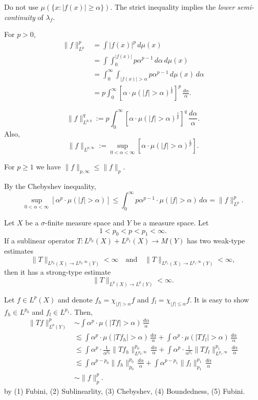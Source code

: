 \documentclass{../../large}
\begin{document}
Do not use $\mu(\{x:|f(x)|\ge\alpha\})$.
The strict inequality implies the \emph{lower semi-continuity} of $\lambda_f$.


For $p>0$,
\begin{align*}
\|f\|_{L^p}^p
&=\int|f(x)|^p\,d\mu(x)\\
&=\int\int_0^{|f(x)|}p\alpha^{p-1}\,d\alpha\,d\mu(x)\\
&=\int_0^\infty\int_{|f(x)|>\alpha}p\alpha^{p-1}\,d\mu(x)\,d\alpha\\
&=p\int_0^\infty\left[\alpha\cdot\mu(|f|>\alpha)^\frac1p\right]^p\,\frac{d\alpha}\alpha.
\end{align*}

\begin{defn}
\[\|f\|_{L^{p,q}}^q:=p\int_0^\infty\left[\alpha\cdot\mu(|f|>\alpha)^\frac1p\right]^q\,\frac{d\alpha}\alpha.\]
Also,
\[\|f\|_{L^{p,\infty}}:=\sup_{0<\alpha<\infty}\left[\alpha\cdot\mu(|f|>\alpha)^\frac1p\right].\]
\end{defn}
\begin{thm}
For $p\ge1$ we have $\|f\|_{p,\infty}\le\|f\|_p$.
\end{thm}
\begin{pf}
By the Chebyshev inequality,
\[\sup_{0<\alpha<\infty}\left[\alpha^p\cdot\mu(|f|>\alpha)\right]\le\int_0^\infty p\alpha^{p-1}\cdot\mu(|f|>\alpha)\,d\alpha=\|f\|_{L^p}^p.\]

\end{pf}

\begin{prb}
Let $X$ be a $\sigma$-finite measure space and $Y$ be a measure space.
Let
\[1<p_0<p<p_1<\infty.\]
If a sublinear operator $T\colon L^{p_0}(X)+L^{p_1}(X)\to M(Y)$ has two weak-type estimates
\[\|T\|_{L^{p_0}(X)\to L^{p_0,\infty}(Y)}<\infty\quad\text{and}\quad\|T\|_{L^{p_1}(X)\to L^{p_1,\infty}(Y)}<\infty,\]
then it has a strong-type estimate
\[\|T\|_{L^p(X)\to L^p(Y)}<\infty.\]
\end{prb}
\begin{pf}
Let $f\in L^p(X)$ and denote $f_h=\chi_{|f|>\alpha}f$ and $f_l=\chi_{|f|\le\alpha}f$.
It is easy to show $f_h\in L^{p_0}$ and $f_l\in L^{p_1}$.
Then,
\begin{align*} %
\|Tf\|_{L^p(Y)}^p&\sim\int\alpha^p\cdot\mu(|Tf|>\alpha)\,\frac{d\alpha}\alpha\\
&\lesssim\int\alpha^p\cdot\mu(|Tf_h|>\alpha)\,\frac{d\alpha}\alpha+\int\alpha^p\cdot\mu(|Tf_l|>\alpha)\,\frac{d\alpha}\alpha\\
&\le\int\alpha^p\cdot\frac1{\alpha^{p_0}}\|Tf_h\|_{L^{p_0,\infty}}^{p_0}\,\frac{d\alpha}\alpha+\int\alpha^p\cdot\frac1{\alpha^{q_1}}\|Tf_l\|_{L^{p_1,\infty}}^{p_1}\,\frac{d\alpha}\alpha\\
&\lesssim\int\alpha^{p-p_0}\|f_h\|_{p_0}^{p_0}\,\frac{d\alpha}\alpha+\int\alpha^{p-p_1}\|f_l\|_{p_1}^{p_1}\,\frac{d\alpha}\alpha\\
&\sim\|f\|_p^p.
\end{align*}
by (1) Fubini, (2) Sublinearlity, (3) Chebyshev, (4) Boundedness, (5) Fubini.
\end{pf}
\end{document}
